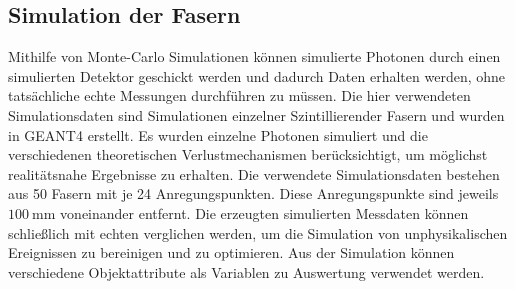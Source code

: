 \subsection{Simulation der Fasern}

Mithilfe von Monte-Carlo Simulationen können simulierte Photonen durch einen simulierten Detektor geschickt werden und dadurch Daten erhalten
werden, ohne tatsächliche echte Messungen durchführen zu müssen. Die hier verwendeten Simulationsdaten sind Simulationen einzelner Szintillierender
Fasern und wurden in GEANT4 erstellt. Es wurden einzelne Photonen simuliert und die verschiedenen theoretischen Verlustmechanismen berücksichtigt,
um möglichst realitätsnahe Ergebnisse zu erhalten. Die verwendete Simulationsdaten bestehen aus 50 Fasern mit je 24 Anregungspunkten. Diese
Anregungspunkte sind jeweils $\qty{100}{\milli\metre}$ voneinander entfernt. Die erzeugten simulierten Messdaten können schließlich mit echten 
verglichen werden, um die Simulation von unphysikalischen Ereignissen zu bereinigen und zu optimieren. Aus der Simulation können verschiedene Objektattribute
als Variablen zu Auswertung verwendet werden.